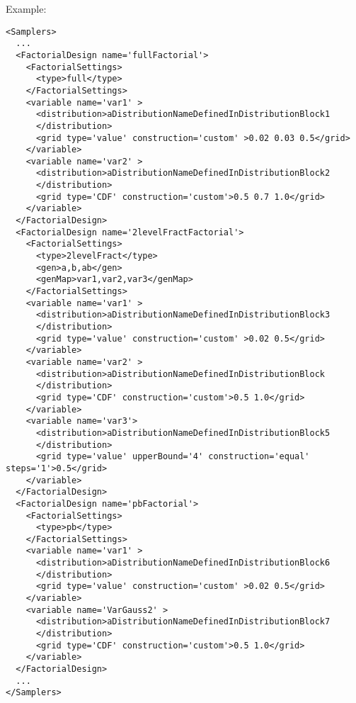 Example:
\begin{lstlisting}[style=XML,morekeywords={construction,upperBound,steps}]
<Samplers>
  ...
  <FactorialDesign name='fullFactorial'>
    <FactorialSettings>
      <type>full</type>
    </FactorialSettings>
    <variable name='var1' >
      <distribution>aDistributionNameDefinedInDistributionBlock1
      </distribution> 
      <grid type='value' construction='custom' >0.02 0.03 0.5</grid>
    </variable>
    <variable name='var2' >
      <distribution>aDistributionNameDefinedInDistributionBlock2
      </distribution> 
      <grid type='CDF' construction='custom'>0.5 0.7 1.0</grid>
    </variable>
  </FactorialDesign>
  <FactorialDesign name='2levelFractFactorial'>
    <FactorialSettings>
      <type>2levelFract</type>
      <gen>a,b,ab</gen>
      <genMap>var1,var2,var3</genMap>
    </FactorialSettings>
    <variable name='var1' >
      <distribution>aDistributionNameDefinedInDistributionBlock3
      </distribution> 
      <grid type='value' construction='custom' >0.02 0.5</grid>
    </variable>
    <variable name='var2' >
      <distribution>aDistributionNameDefinedInDistributionBlock
      </distribution> 
      <grid type='CDF' construction='custom'>0.5 1.0</grid>
    </variable>
    <variable name='var3'>
      <distribution>aDistributionNameDefinedInDistributionBlock5
      </distribution> 
      <grid type='value' upperBound='4' construction='equal' steps='1'>0.5</grid>
    </variable>
  </FactorialDesign>
  <FactorialDesign name='pbFactorial'>
    <FactorialSettings>
      <type>pb</type>
    </FactorialSettings>
    <variable name='var1' >
      <distribution>aDistributionNameDefinedInDistributionBlock6
      </distribution> 
      <grid type='value' construction='custom' >0.02 0.5</grid>
    </variable>
    <variable name='VarGauss2' >
      <distribution>aDistributionNameDefinedInDistributionBlock7
      </distribution> 
      <grid type='CDF' construction='custom'>0.5 1.0</grid>
    </variable>
  </FactorialDesign>
  ...
</Samplers>
\end{lstlisting}

